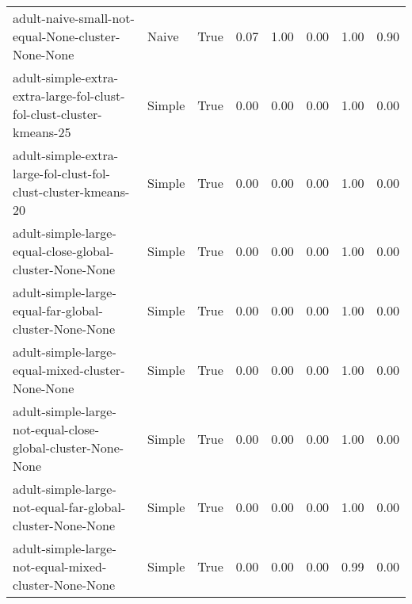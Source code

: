 \begin{longtable}{llllllll}
                                                           adult-naive-small-not-equal-None-cluster-None-None &        Naive &        True &                 0.07 &                 1.00 &                         0.00 &                         1.00 &                         0.90 \\
                                         adult-simple-extra-extra-large-fol-clust-fol-clust-cluster-kmeans-25 &       Simple &        True &                 0.00 &                 0.00 &                         0.00 &                         1.00 &                         0.00 \\
                                               adult-simple-extra-large-fol-clust-fol-clust-cluster-kmeans-20 &       Simple &        True &                 0.00 &                 0.00 &                         0.00 &                         1.00 &                         0.00 \\
                                                      adult-simple-large-equal-close-global-cluster-None-None &       Simple &        True &                 0.00 &                 0.00 &                         0.00 &                         1.00 &                         0.00 \\
                                                        adult-simple-large-equal-far-global-cluster-None-None &       Simple &        True &                 0.00 &                 0.00 &                         0.00 &                         1.00 &                         0.00 \\
                                                             adult-simple-large-equal-mixed-cluster-None-None &       Simple &        True &                 0.00 &                 0.00 &                         0.00 &                         1.00 &                         0.00 \\
                                                  adult-simple-large-not-equal-close-global-cluster-None-None &       Simple &        True &                 0.00 &                 0.00 &                         0.00 &                         1.00 &                         0.00 \\
                                                    adult-simple-large-not-equal-far-global-cluster-None-None &       Simple &        True &                 0.00 &                 0.00 &                         0.00 &                         1.00 &                         0.00 \\
                                                         adult-simple-large-not-equal-mixed-cluster-None-None &       Simple &        True &                 0.00 &                 0.00 &                         0.00 &                         0.99 &                         0.00 \\

\end{longtable}
